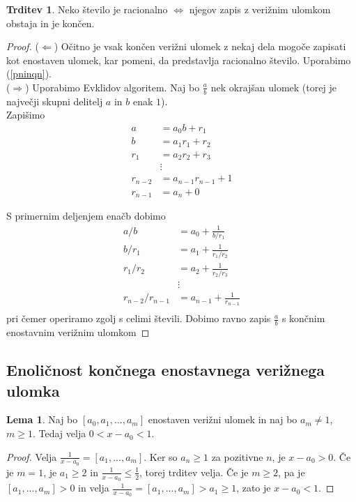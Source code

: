 \documentclass[a4paper,12pt]{article}
\theoremstyle{definition}
\theoremstyle{proposition}
\newtheorem{trd}{Trditev}[section]
\theoremstyle{theorem}
\theoremstyle{lemma}
\newtheorem{lem}{Lema}[section]
\begin{document}
\begin{trd}
\label{lastnosracionalnega}
Neko število je racionalno $\Leftrightarrow$ njegov zapis z verižnim ulomkom obstaja in je končen.
\end{trd}

\begin{proof}
($\Leftarrow$) Očitno je vsak končen verižni ulomek z nekaj dela mogoče zapisati kot enostaven ulomek, kar pomeni, da predstavlja racionalno število. Uporabimo (\ref{pninqn}).\\
($\Rightarrow$) Uporabimo Evklidov algoritem. Naj bo $\frac{a}{b}$ nek okrajšan ulomek (torej je največji skupni delitelj $a$ in $b$ enak $1$).\\
Zapišimo
\begin{align*}
a &= a_0 b + r_1 \\
b &= a_1 r_1 + r_2 \\
r_1 &= a_2 r_2 + r_3 \\
&\vdots \\
r_{n-2} &= a_{n-1} r_{n-1} + 1 \\
r_{n-1} &= a_n + 0
\end{align*}

\vspace{5mm}

S primernim deljenjem enačb dobimo
\begin{align*}
a/b &= a_0 + \frac{1}{b/r_1} \\
b/r_1 &= a_1 + \frac{1}{r_1/r_2} \\
r_1/r_2 &= a_2 + \frac{1}{r_2/r_3} \\
&\vdots \\
r_{n-2}/r_{n-1} &= a_{n-1} + \frac{1}{r_{n-1}} \\
\end{align*}
pri čemer operiramo zgolj s celimi števili. Dobimo ravno zapis $\frac{a}{b}$ s končnim enostavnim verižnim ulomkom
\end{proof}

\subsection{Enoličnost končnega enostavnega verižnega ulomka} \label{enolicnost}

\begin{lem}
\label{celidel}
Naj bo $[a_0, a_1, ..., a_m]$ enostaven verižni ulomek in naj bo $a_m \neq 1$, $m \geq 1$. Tedaj velja $0<x-a_0<1$.
\end{lem}
\begin{proof}
Velja $\frac{1}{x-a_0} = [a_1, ..., a_m]$. Ker so $a_n \geq 1$ za pozitivne $n$, je $x-a_0 > 0$. Če je $m=1$, je $a_1 \geq 2$ in $\frac{1}{x-a_0} \leq \frac{1}{2}$, torej trditev velja. Če je $m\geq2$, pa je $ [a_1, ..., a_m] > 0$ in velja $\frac{1}{x-a_0} = [a_1, ..., a_m] > a_1 \geq1$, zato je $x-a_0<1$.
\end{proof}
\end{document}
